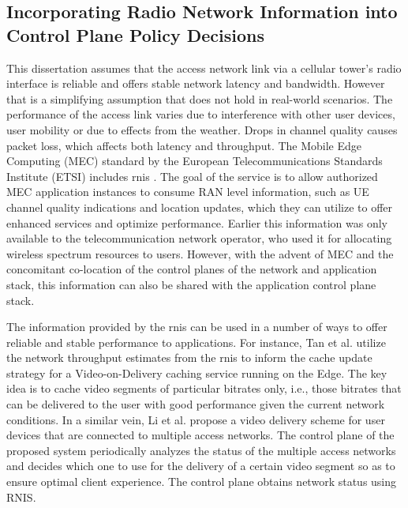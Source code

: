 \subsection{Incorporating Radio Network Information into Control Plane Policy Decisions}
This dissertation assumes that the access network link via a cellular tower's radio interface is reliable and offers stable network latency and bandwidth. However that is a simplifying assumption that does not hold in real-world scenarios. The performance of the access link varies due to interference with other user devices, user mobility or due to effects from the weather. Drops in channel quality causes packet loss, which affects both latency and throughput. The Mobile Edge Computing (MEC) standard by the European Telecommunications Standards Institute (ETSI) includes \gls{rnis} \cite{etsi_rnis}. The goal of the service is to allow authorized MEC application instances to consume RAN level information, such as UE channel quality indications and location updates, which they can utilize to offer enhanced services and optimize performance. Earlier this information was only available to the telecommunication network operator, who used it for allocating wireless spectrum resources to users. However, with the advent of MEC and the concomitant co-location of the control planes of the network and application stack, this information can also be shared with the application control plane stack.
\par The information provided by the \gls{rnis} can be used in a number of ways to offer reliable and stable performance to applications. For instance, Tan et al. \cite{tan2018radio} utilize the network throughput estimates from the \gls{rnis} to inform the cache update strategy for a Video-on-Delivery caching service running on the Edge. The key idea is to cache video segments of particular bitrates only, i.e., those bitrates that can be delivered to the user with good performance given the current network conditions. In a similar vein, Li et al. \cite{li2017mobile} propose a video delivery scheme for user devices that are connected to multiple access networks. The control plane of the proposed system periodically analyzes the status of the multiple access networks and decides which one to use for the delivery of a certain video segment so as to ensure optimal client experience. The control plane obtains network status using RNIS. 

